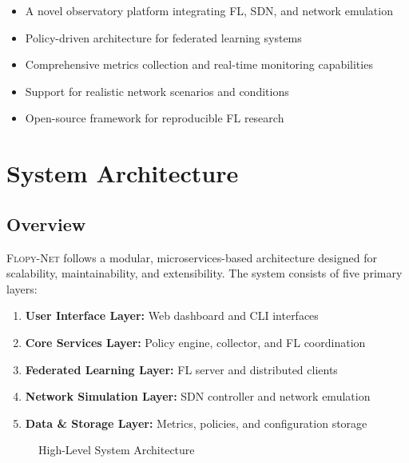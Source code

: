 \documentclass[12pt,a4paper,twoside]{article}
\newcommand{\flopynet}{\textsc{Flopy-Net}}
\begin{document}
\begin{itemize}
    \item A novel observatory platform integrating FL, SDN, and network emulation
    \item Policy-driven architecture for federated learning systems
    \item Comprehensive metrics collection and real-time monitoring capabilities
    \item Support for realistic network scenarios and conditions
    \item Open-source framework for reproducible FL research
\end{itemize}

\section{System Architecture}

\subsection{Overview}

\flopynet{} follows a modular, microservices-based architecture designed for scalability, maintainability, and extensibility. The system consists of five primary layers:

\begin{enumerate}
    \item \textbf{User Interface Layer:} Web dashboard and CLI interfaces
    \item \textbf{Core Services Layer:} Policy engine, collector, and FL coordination
    \item \textbf{Federated Learning Layer:} FL server and distributed clients
    \item \textbf{Network Simulation Layer:} SDN controller and network emulation
    \item \textbf{Data \& Storage Layer:} Metrics, policies, and configuration storage
\end{enumerate}

\begin{figure}[H]
\centering
{}
\caption{High-Level System Architecture}
\label{fig:architecture}
\end{figure}
\end{document}
